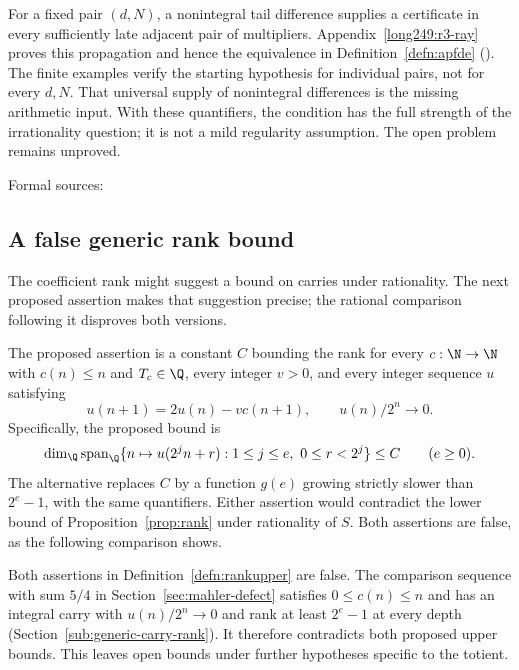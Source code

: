 For a fixed pair $(d,N)$, a nonintegral tail difference supplies a
certificate in every sufficiently late adjacent pair of multipliers.
Appendix~\ref{long249:r3-ray} proves this propagation and hence the
equivalence in Definition~\ref{defn:apfde}
().
The finite examples verify the starting hypothesis for individual
pairs, not for every $d,N$. That universal supply of nonintegral
differences is the missing arithmetic input. With these quantifiers,
the condition has the full strength of the irrationality question;
it is not a mild regularity assumption. The open problem remains unproved.

\noindent Formal sources: 

\subsection{A false generic rank bound}

The coefficient rank might suggest a bound on carries under
rationality. The next proposed assertion makes that suggestion precise;
the rational comparison following it disproves both versions.

\begin{defn}
\label{defn:rankupper}
The proposed assertion is a constant $C$ bounding the rank for every
$c:\N\to\N$ with $c(n)\le n$ and $T_c\in\Q$, every integer $v>0$,
and every integer sequence $u$ satisfying
\[
 u(n+1)=2u(n)-v c(n+1),\qquad u(n)/2^n\longrightarrow0.
\]
Specifically, the proposed bound is
\[
 \dim_{\Q}\operatorname{span}_{\Q}
 \{n\mapsto u(2^jn+r):1\le j\le e,\ 0\le r<2^j\}\le C
 \qquad(e\ge0).
\]
The alternative replaces $C$ by a function $g(e)$ growing strictly slower
than $2^e-1$, with the same quantifiers. Either assertion would contradict
the lower bound of Proposition~\ref{prop:rank} under rationality of $S$.
Both assertions are false, as the following comparison shows.
\end{defn}

Both assertions in Definition~\ref{defn:rankupper} are false.
The comparison sequence with sum $5/4$ in
Section~\ref{sec:mahler-defect} satisfies $0\le c(n)\le n$ and has
an integral carry with $u(n)/2^n\to0$ and rank at least $2^e-1$
at every depth (Section~\ref{sub:generic-carry-rank}). It therefore
contradicts both proposed upper bounds. This leaves open bounds
under further hypotheses specific to the totient.

